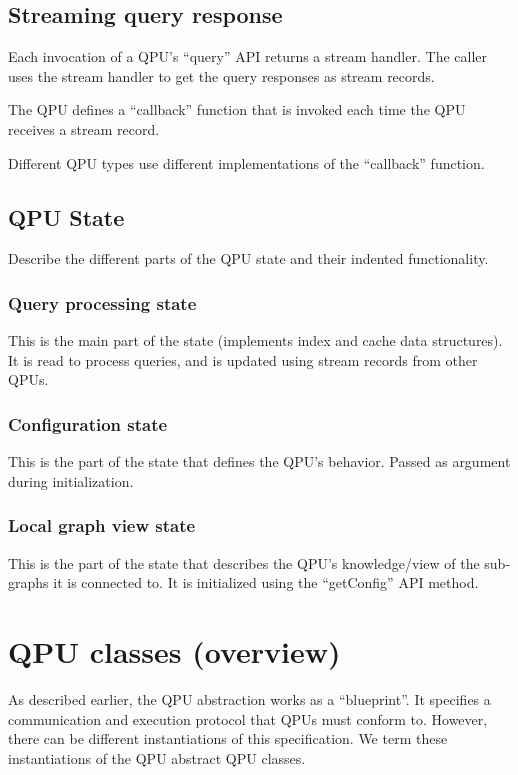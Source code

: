\subsection{Streaming query response}
Each invocation of a QPU's ``query'' API returns a stream handler.
The caller uses the stream handler to get the query responses as stream records.

The QPU defines a ``callback'' function that is invoked each time the QPU
receives a stream record.

Different QPU types use different implementations of the ``callback''
function.

\subsection{QPU State}
Describe the different parts of the QPU state and their indented functionality.

\subsubsection{Query processing state}
This is the main part of the state (implements index and cache data structures).
It is read to process queries, and is updated using stream records from other
QPUs.
\subsubsection{Configuration state}
This is the part of the state that defines the QPU's behavior.
Passed as argument during initialization.

\subsubsection{Local graph view state}
This is the part of the state that describes the QPU's knowledge/view of the
sub-graphs it is connected to.
It is initialized using the ``getConfig'' API method.

\section{QPU classes (overview)}
\label{sec:qpu_classes}

As described earlier, the QPU abstraction works as a ``blueprint''.
It specifies a communication and execution protocol that QPUs must conform to.
However, there can be different instantiations of this specification.
We term these instantiations of the QPU abstract QPU classes.


